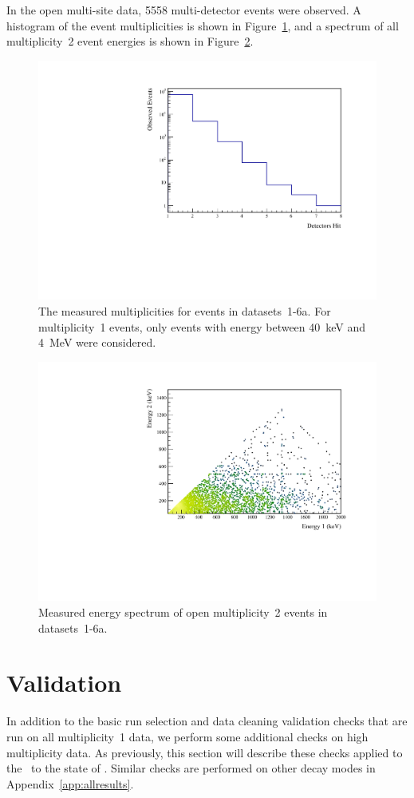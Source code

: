 \documentclass[/main.tex]{subfiles}
\begin{document}
In the open multi-site data, 5558 multi-detector events were observed.
A histogram of the event multiplicities is shown in Figure~\ref{fig:datamult}, and a spectrum of all multiplicity~2 event energies is shown in Figure~\ref{fig:data2D}.
\begin{figure}[h]
  \centering
  \includegraphics[width=.6\linewidth]{DataMultiplicity}
  \caption[Measured event multiplicities]{\label{fig:datamult}
    The measured multiplicities for events in datasets~1-6a. For multiplicity~1 events, only events with energy between 40~keV and 4~MeV were considered.
  }
\end{figure}
\begin{figure}[h]
  \centering
  \includegraphics[width=.8\linewidth]{Data2D}
  \caption[Measured energy spectrum of multiplicity~2 events]{\label{fig:data2D}
    Measured energy spectrum of open multiplicity~2 events in datasets~1-6a.
  }
\end{figure}

\section{Validation}
In addition to the basic run selection and data cleaning validation checks that are run on all multiplicity~1 data, we perform some additional checks on high multiplicity data.
As previously, this section will describe these checks applied to the \tnbb\ to the  state of .
Similar checks are performed on other decay modes in Appendix~\ref{app:allresults}.
\end{document}

